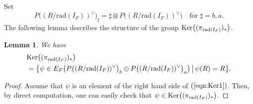 \documentclass[11pt]{amsart}
\newtheorem{lemma}[thm]{Lemma}%
\begin{document}
{
Set
\[P\big((R/\mathrm{rad}(I_F))^{\vee}\big)_{\sharp}
={\sharp}\otimes P\big((R/\mathrm{rad}(I_F))^{\vee}\big)\quad\mbox{for }
\sharp=b,a.\] 
The following lemma describes the structure of the group
$\mbox{\rm Ker}\bigl((\pi_{\mathrm{rad}(I_F)})_*\bigr)$. 
\begin{lemma}\label{lemma:Ker1} 
We have
\begin{equation}\label{eqn:Ker1}
\begin{aligned}
&\mbox{\rm Ker}\bigl((\pi_{\mathrm{rad}(I_F)})_*\bigr)\\
&=
\bigl\{\psi\in E_F\bigl(P\big((R/\mathrm{rad}(I_F))^{\vee}\big)_b\oplus 
P\big((R/\mathrm{rad}(I_F))^{\vee}\big)_a\bigr)\,\bigl|\,
\psi(R)=R\bigr\}.
\end{aligned}
\end{equation}
\end{lemma}
\begin{proof}
Assume that $\psi$ is an element of the right hand side of $(\ref{eqn:Ker1})$.
Then, by direct computation, one can easily check that
$\psi\in \mbox{\rm Ker}\bigl((\pi_{\mathrm{rad}(I_F)})_*\bigr)$.


\end{proof}}
\end{document}
